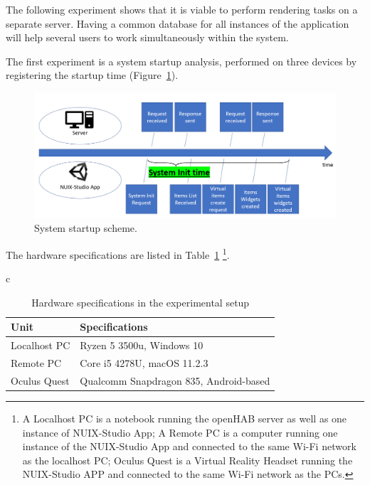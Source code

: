 The following experiment shows that it is viable to perform rendering tasks on a separate server. Having a common database for all instances of the application will help several users to work simultaneously within the system.

The first experiment is a system startup analysis, performed on three devices by registering the startup time (Figure~\ref{fig:SystemStartupScheme-figure}).

\begin{figure}
  \centering
  \includegraphics[width = 0.9 \linewidth]{figures/SystemStartupScheme.png}
  \caption{System startup scheme.}
  \label{fig:SystemStartupScheme-figure}
\end{figure}

The hardware specifications are listed in Table~\ref{tab:hardware-specifications-table} \footnote{A Localhost PC is a notebook running the openHAB server as well as one instance of NUIX-Studio App; A Remote PC is a computer running one instance of the NUIX-Studio App and connected to the same Wi-Fi network as the localhost PC; Oculus Quest is a Virtual Reality Headset running the NUIX-Studio APP and connected to the same Wi-Fi network as the PCs.}.

\begin{table}
  \centering
  \begin{threeparttable}[c]
    \caption{Hardware specifications in the experimental setup}
    \label{tab:hardware-specifications-table}c
    \begin{tabular}{ll}
      \toprule
      Unit    &         Specifications                 \\
      \midrule
      Localhost PC & Ryzen 5 3500u, Windows 10 \\
      Remote PC & Core i5 4278U, macOS 11.2.3    \\
      Oculus Quest        & Qualcomm Snapdragon 835, Android-based            \\
      \bottomrule
    \end{tabular}
  \end{threeparttable}
\end{table}

